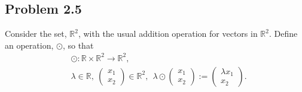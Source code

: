 \subsection*{Problem 2.5}
Consider the set, $\mathbb{R}^2$, with the usual addition operation for vectors in $\mathbb{R}^2$. Define an operation, $\odot$, so that
	\begin{align*}
		&\odot: \mathbb{R}\times \mathbb{R}^2\to \mathbb{R}^2,\\
		&\lambda\in\mathbb{R},\ \begin{pmatrix}x_1\\x_2\end{pmatrix}\in\mathbb{R}^2,\ \ 
		\lambda\odot \begin{pmatrix}x_1\\x_2\end{pmatrix}:= \begin{pmatrix}\lambda x_1\\x_2\end{pmatrix}.
	\end{align*}
	
